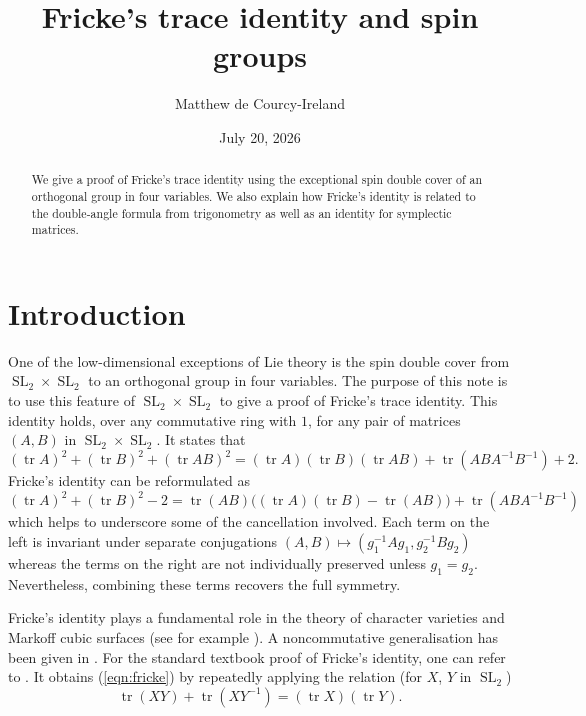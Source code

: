 \documentclass[11pt]{amsart}
\title{Fricke's trace identity and spin groups}
\author{Matthew de Courcy-Ireland}
\date{July 20, 2026}
\theoremstyle{definition}
\numberwithin{figure}{section}
\numberwithin{equation}{section}
\numberwithin{table}{section}
\newcommand{\SL}{\operatorname{SL}}
\newcommand{\tr}{\operatorname{tr}}
\begin{document}
\maketitle
\begin{abstract}
We give a proof of Fricke's trace identity using the exceptional spin double cover of an orthogonal group in four variables.
We also explain how Fricke's identity is related to the double-angle formula from trigonometry as well as an identity for symplectic matrices.
\end{abstract}
\section{Introduction}

One of the low-dimensional exceptions of Lie theory is the spin double cover from $\SL_2 \times \SL_2$ to an orthogonal group in four variables.
The purpose of this note is to use this feature of $\SL_2 \times \SL_2$ to give a proof of Fricke's trace identity.
This identity holds, over any commutative ring with $1$, for any pair of matrices $(A,B)$ in $\SL_2 \times \SL_2$.
It states that
\begin{equation} \label{eqn:fricke}
(\tr{A})^2+(\tr{B})^2+(\tr{AB})^2 = (\tr{A})(\tr{B})(\tr{AB})+\tr(ABA^{-1}B^{-1})+2.
\end{equation}
Fricke's identity can be reformulated as
\begin{equation} \label{eqn:fricke-symm}
(\tr{A})^2+(\tr{B})^2-2 = \tr(AB)\big((\tr{A})(\tr{B})-\tr(AB)\big)+\tr(ABA^{-1}B^{-1})
\end{equation}
which helps to underscore some of the cancellation involved.
Each term on the left is invariant under separate conjugations $(A,B) \mapsto (g_1^{-1}Ag_1, g_2^{-1}Bg_2)$
whereas the terms on the right are not individually preserved unless $g_1=g_2$.
Nevertheless, combining these terms recovers the full symmetry.

Fricke's identity plays a fundamental role in the theory of character varieties and Markoff cubic surfaces (see for example \cite{goldman}).
A noncommutative generalisation has been given in \cite[Corollary 4.7]{GKW}.
For the standard textbook proof of Fricke's identity, one can refer to \cite[p.65, proof of Proposition 4.3]{aigner}.
It obtains (\ref{eqn:fricke}) by repeatedly applying the relation (for $X$, $Y$ in $\SL_2$)
\begin{equation} \label{eqn:trace-inverse}
\tr(XY)+\tr(XY^{-1})=(\tr{X})(\tr{Y}).
\end{equation}
\end{document}
